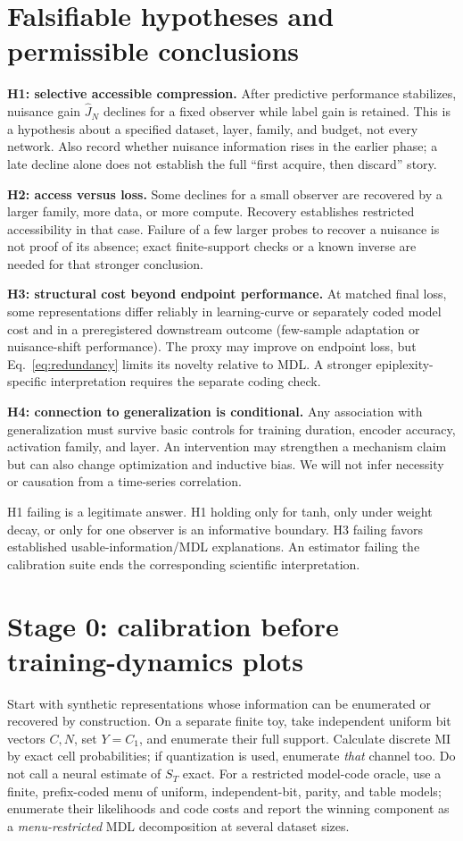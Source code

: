 \documentclass[11pt,a4paper]{article}
\begin{document}
\section{Falsifiable hypotheses and permissible conclusions}
\textbf{H1: selective accessible compression.} After predictive performance stabilizes, nuisance gain $\widehat J_N$ declines for a fixed observer while label gain is retained. This is a hypothesis about a specified dataset, layer, family, and budget, not every network. Also record whether nuisance information rises in the earlier phase; a late decline alone does not establish the full ``first acquire, then discard'' story.

\textbf{H2: access versus loss.} Some declines for a small observer are recovered by a larger family, more data, or more compute. Recovery establishes restricted accessibility in that case. Failure of a few larger probes to recover a nuisance is not proof of its absence; exact finite-support checks or a known inverse are needed for that stronger conclusion.

\textbf{H3: structural cost beyond endpoint performance.} At matched final loss, some representations differ reliably in learning-curve or separately coded model cost and in a preregistered downstream outcome (few-sample adaptation or nuisance-shift performance). The proxy may improve on endpoint loss, but Eq.~\eqref{eq:redundancy} limits its novelty relative to MDL. A stronger epiplexity-specific interpretation requires the separate coding check.

\textbf{H4: connection to generalization is conditional.} Any association with generalization must survive basic controls for training duration, encoder accuracy, activation family, and layer. An intervention may strengthen a mechanism claim but can also change optimization and inductive bias. We will not infer necessity or causation from a time-series correlation.

H1 failing is a legitimate answer. H1 holding only for tanh, only under weight decay, or only for one observer is an informative boundary. H3 failing favors established usable-information/MDL explanations. An estimator failing the calibration suite ends the corresponding scientific interpretation.

\section{Stage 0: calibration before training-dynamics plots}
\label{sec:controls}
Start with synthetic representations whose information can be enumerated or recovered by construction. On a separate finite toy, take independent uniform bit vectors $C,N$, set $Y=C_1$, and enumerate their full support. Calculate discrete MI by exact cell probabilities; if quantization is used, enumerate \emph{that} channel too. Do not call a neural estimate of $S_T$ exact. For a restricted model-code oracle, use a finite, prefix-coded menu of uniform, independent-bit, parity, and table models; enumerate their likelihoods and code costs and report the winning component as a \emph{menu-restricted} MDL decomposition at several dataset sizes.
\end{document}
